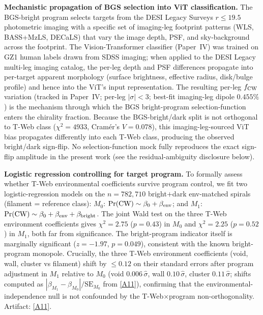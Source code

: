 \documentclass[aps,prd,twocolumn,superscriptaddress,showpacs,preprintnumbers,nofootinbib,longbibliography,floatfix]{revtex4-2}
\newcommand{\repoBase}{https://github.com/Hubify-Projects/bigbounce/blob/main}
\begin{document}
\textbf{Mechanistic propagation of BGS selection into ViT classification.}
The BGS-bright program selects targets from the DESI Legacy Surveys
$r\!\le\!19.5$ photometric imaging with a specific set of imaging-leg
footprint patterns (WLS, BASS+MzLS, DECaLS) that vary the image depth,
PSF, and sky-background across the footprint. The Vision-Transformer
classifier (Paper~IV) was trained on GZ1 human labels drawn from SDSS
imaging; when applied to the DESI Legacy multi-leg imaging catalog, the
per-leg depth and PSF differences propagate into per-target apparent
morphology (surface brightness, effective radius, disk/bulge profile)
and hence into the ViT's input representation. The resulting per-leg
$f_{\rm CW}$ variation (tracked in Paper~IV; per-leg $|\sigma|\!<\!3$;
best-fit imaging-leg dipole $0.455\%$) is the mechanism through which
the BGS bright-program selection-function enters the chirality fraction.
Because the BGS-bright/dark split is not orthogonal to T-Web class
($\chi^2 = 4933$, Cram\'{e}r's $V = 0.078$), this imaging-leg-sourced
ViT bias propagates differently into each T-Web class, producing the
observed bright/dark sign-flip. No selection-function mock fully
reproduces the exact sign-flip amplitude in the present work
(see the residual-ambiguity disclosure below).

\textbf{Logistic regression controlling for target program.}
To formally assess whether T-Web environmental coefficients survive
program control, we fit two logistic-regression models on the
$n = 782{,}710$ bright$+$dark env-matched spirals
(filament = reference class):
$M_0$: $\Pr(\rm CW) \sim \beta_0 + \beta_{\rm env}$; and
$M_1$: $\Pr(\rm CW) \sim \beta_0 + \beta_{\rm env} + \beta_{\rm bright}$.
The joint Wald test on the three T-Web environment coefficients gives
$\chi^2 = 2.75$ ($p = 0.43$) in $M_0$ and $\chi^2 = 2.25$ ($p = 0.52$)
in $M_1$, both far from significance. The bright-program indicator
itself is marginally significant ($z = -1.97$, $p = 0.049$), consistent
with the known bright-program monopole. Crucially, the three T-Web
environment coefficients (void, wall, cluster vs filament) shift by
$\leq 0.12$ on their standard errors after program adjustment
in $M_1$ relative to $M_0$ (void $0.006\,\hat\sigma$, wall $0.10\,\hat\sigma$,
cluster $0.11\,\hat\sigma$; shifts computed as $|\beta_{M_1}-\beta_{M_0}|/\mathrm{SE}_{M_0}$
from \href{\repoBase/pipelines/p5\_desi\_chirality/outputs/27\_ext1\_logistic\_program\_control.json}{[A11]}),
confirming that the environmental-independence
null is not confounded by the T-Web$\times$program non-orthogonality.
Artifact:
\href{\repoBase/pipelines/p5\_desi\_chirality/outputs/27\_ext1\_logistic\_program\_control.json}{[A11]}.
\end{document}
